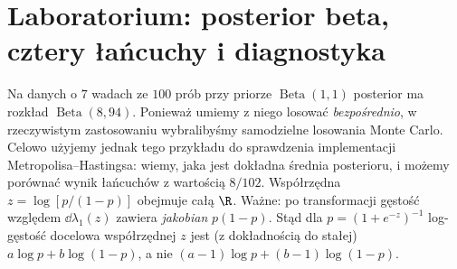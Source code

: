 \section{Laboratorium: posterior beta, cztery łańcuchy i diagnostyka}
\label{sec:mcmc-laboratorium}
Na danych o $7$ wadach ze $100$ prób przy priorze
$\operatorname{Beta}(1,1)$ posterior ma rozkład
$\operatorname{Beta}(8,94)$. Ponieważ umiemy z niego
losować \emph{bezpośrednio}, w rzeczywistym zastosowaniu
wybralibyśmy samodzielne losowania Monte Carlo.
Celowo użyjemy jednak tego przykładu do sprawdzenia
implementacji Metropolisa--Hastingsa: wiemy, jaka
jest dokładna średnia posterioru, i możemy porównać
wynik łańcuchów z wartością $8/102$.
Współrzędna $z=\log[p/(1-p)]$ obejmuje całą $\R$.
Ważne: po transformacji gęstość względem $\dd\lambda_1(z)$
zawiera \emph{jakobian} $p(1-p)$.
Stąd dla $p=(1+e^{-z})^{-1}$ log-gęstość docelowa
współrzędnej $z$ jest (z dokładnością do stałej)
$a\log p+b\log(1-p)$, a nie
$(a-1)\log p+(b-1)\log(1-p)$.

